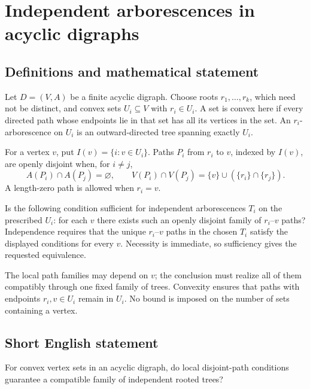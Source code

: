 \documentclass[11pt,a4paper]{article}
\begin{document}
\section*{Independent arborescences in acyclic digraphs}\label{statement}

\subsection{Definitions and mathematical statement}
Let $D=(V,A)$ be a finite acyclic digraph. Choose roots
$r_1,\ldots,r_k$, which need not be distinct, and convex sets $U_i\subseteq V$
with $r_i\in U_i$. A set is convex here if every directed path whose
endpoints lie in that set has all its vertices in the set.
An $r_i$-arborescence on $U_i$ is an outward-directed tree spanning
exactly $U_i$.

For a vertex $v$, put $I(v)=\{i:v\in U_i\}$. Paths $P_i$ from $r_i$
to $v$, indexed by $I(v)$, are openly disjoint when, for $i\ne j$,
\[
 A(P_i)\cap A(P_j)=\varnothing,\qquad
 V(P_i)\cap V(P_j)=\{v\}\cup(\{r_i\}\cap\{r_j\}).
\]
A length-zero path is allowed when $r_i=v$.

Is the following condition sufficient for independent arborescences
$T_i$ on the prescribed $U_i$: for each $v$ there exists such an
openly disjoint family of $r_i$--$v$ paths? Independence requires that
the unique $r_i$--$v$ paths in the chosen $T_i$ satisfy the displayed
conditions for every $v$. Necessity is immediate, so sufficiency gives
the requested equivalence.

The local path families may depend on $v$; the conclusion must realize
all of them compatibly through one fixed family of trees. Convexity
ensures that paths with endpoints $r_i,v\in U_i$ remain in $U_i$.
No bound is imposed on the number of sets containing a vertex.
\subsection{Short English statement}
For convex vertex sets in an acyclic digraph, do local disjoint-path
conditions guarantee a compatible family of independent rooted trees?
\end{document}
